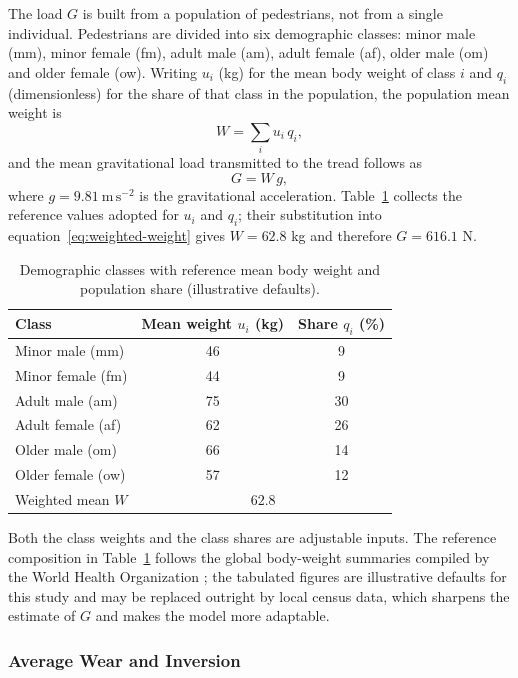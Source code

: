 The load $G$ is built from a population of pedestrians, not from a single individual. Pedestrians are divided into six demographic classes: minor male (mm), minor female (fm), adult male (am), adult female (af), older male (om) and older female (ow). Writing $u_i$ (kg) for the mean body weight of class $i$ and $q_i$ (dimensionless) for the share of that class in the population, the population mean weight is
\begin{equation}
W = \sum_{i} u_i\, q_i,
\label{eq:weighted-weight}
\end{equation}
and the mean gravitational load transmitted to the tread follows as
\begin{equation}
G = W\, g,
\label{eq:gravity}
\end{equation}
where $g = 9.81~\mathrm{m\,s^{-2}}$ is the gravitational acceleration. Table~\ref{tab:weight} collects the reference values adopted for $u_i$ and $q_i$; their substitution into equation~\eqref{eq:weighted-weight} gives $W = 62.8$ kg and therefore $G = 616.1$ N.

\begin{table}[htbp]
\centering
\caption{Demographic classes with reference mean body weight and population share (illustrative defaults).}
\label{tab:weight}
\begin{tabular}{lcc}
\toprule
Class & Mean weight $u_i$ (kg) & Share $q_i$ (\%) \\
\midrule
Minor male (mm)   & 46 & 9  \\
Minor female (fm) & 44 & 9  \\
Adult male (am)   & 75 & 30 \\
Adult female (af) & 62 & 26 \\
Older male (om)   & 66 & 14 \\
Older female (ow) & 57 & 12 \\
\midrule
Weighted mean $W$ & \multicolumn{2}{c}{$62.8$} \\
\bottomrule
\end{tabular}
\end{table}

Both the class weights and the class shares are adjustable inputs. The reference composition in Table~\ref{tab:weight} follows the global body-weight summaries compiled by the World Health Organization \cite{who-weights}; the tabulated figures are illustrative defaults for this study and may be replaced outright by local census data, which sharpens the estimate of $G$ and makes the model more adaptable.

\subsubsection{Average Wear and Inversion}
\label{subsubsec:average-and-inversion}

